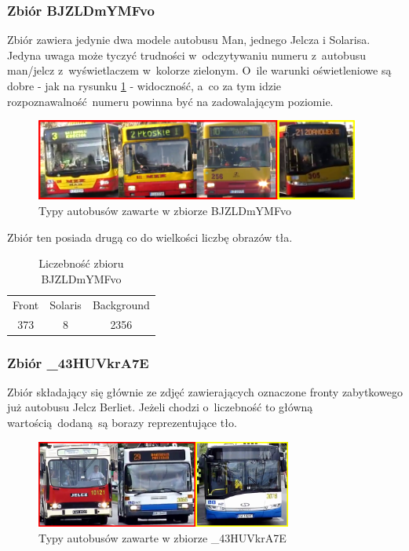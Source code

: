 \newpage

\subsubsection{Zbiór BJZLDmYMFvo}

Zbiór zawiera jedynie dwa modele autobusu Man, jednego
Jelcza i Solarisa. Jedyna uwaga może tyczyć trudności w~odczytywaniu
numeru z~autobusu man/jelcz z~wyświetlaczem w~kolorze zielonym. O~ile
warunki oświetleniowe są dobre - jak na rysunku \ref{fig:BJZLDmYMFvo_types}
- widoczność, a~co za tym idzie rozpoznawalność numeru powinna być na 
zadowalającym poziomie.

\begin{figure}[!h]
    \centering
    \includegraphics[width=0.95\textwidth]{img/exp_trainig_data_BJZ}
    \caption{Typy autobusów zawarte w zbiorze BJZLDmYMFvo}
    \label{fig:BJZLDmYMFvo_types}
\end{figure}

Zbiór ten posiada drugą co do wielkości 
liczbę obrazów tła. 

\begin{table}[!h]
    \centering
    \begin{tabular}{c|c|c}
        Front   & Solaris   & Background \\
        373     & 8         & 2356
    \end{tabular}
    \caption{Liczebność zbioru BJZLDmYMFvo}
    \label{tab:BJZLDmYMFvo_count}
\end{table}

\subsubsection{Zbiór \_43HUVkrA7E}

Zbiór składający się głównie ze zdjęć zawierających oznaczone fronty
zabytkowego już autobusu Jelcz Berliet. Jeżeli chodzi o~liczebność to 
główną wartością dodaną są borazy reprezentujące tło.

\begin{figure}[!h]
    \centering
    \includegraphics[width=0.75\textwidth]{img/exp_trainig_data__43}
    \caption{Typy autobusów zawarte w zbiorze \_43HUVkrA7E}
    \label{fig:_43HUVkrA7E_types}
\end{figure}

